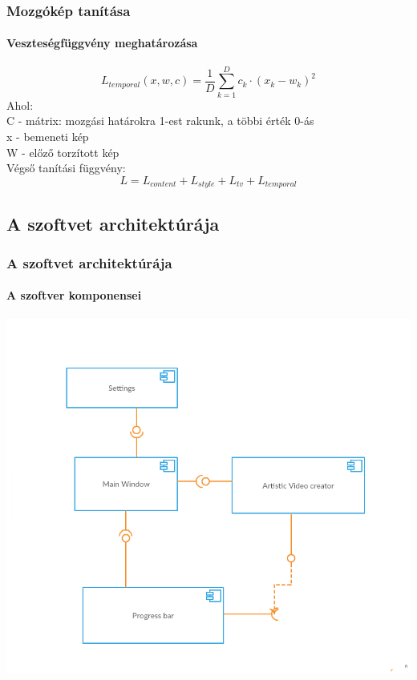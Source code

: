 \documentclass{beamer}
\begin{document}
	\begin{frame}
		\frametitle{Mozgókép tanítása}
		\framesubtitle{Veszteségfüggvény meghatározása}
		
		\begin{equation} \label{eq:2}
			L_{temporal}(x, w, c) = \frac{1}{D}\sum_{k=1}^{D}c_k\cdot(x_k-w_k)^2
		\end{equation}
		Ahol: \\ 
		C - mátrix: mozgási határokra 1-est rakunk, a többi érték 0-ás \\
		x - bemeneti kép \\
		W - előző torzított kép \\
		\vspace{1cm}
		Végső tanítási függvény:
		\begin{equation}
			L = L_{content} + L_{style} + L_{tv} + L_{temporal}
		\end{equation}
		
	\end{frame}

	\subsection{A szoftvet architektúrája}
	
	\begin{frame}
		\frametitle{A szoftvet architektúrája}
		\framesubtitle{A szoftver komponensei}
		\begin{center}
			\includegraphics[scale=0.3]{component_diagram.png}
		\end{center}
	\end{frame}
\end{document}
